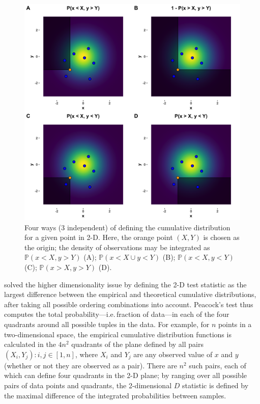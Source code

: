 \documentclass[codesnippet]{jss}
\begin{document}
\begin{figure}[t!]
\centering
\includegraphics{CDF2Dissue}
\caption{\label{fig:kstest2Dissue} Four ways (3 independent) of defining the cumulative distribution for a given point in 2-D.  Here, the orange point $(X,Y)$ is chosen as the origin; the density of observations may be integrated as
$\mathbb{P}(x < X, y > Y)$ (A);
$\mathbb{P}(x < X \cup y < Y)$ (B);
$\mathbb{P}(x < X, y < Y)$ (C);
$\mathbb{P}(x > X, y > Y)$ (D).
}
\end{figure}

\cite{Peacock1983} solved the higher dimensionality issue by defining
the 2-D test statistic as the largest difference between the empirical
and theoretical cumulative distributions, after taking all possible
ordering combinations into account. Peacock's test thus computes the
total probability---i.e.\,fraction of data---in each of
the four quadrants around all possible tuples in the data. For
example, for $n$ points in a two-dimensional space, the empirical
cumulative distribution functions is calculated in the $4n^2$
quadrants of the plane defined by all pairs $(X_i, Y_j): i,j\in[1,n]$, where $X_i$ and
$Y_j$ are any observed value of $x$ and $y$ (whether or not they are observed as a pair).
There are $n^2$ such pairs, each of which can define four quadrants in the 2-D plane;
by ranging over all possible pairs of data points and quadrants, the
2-dimensional $D$ statistic is defined by the maximal difference of
the integrated probabilities between samples.
\end{document}
